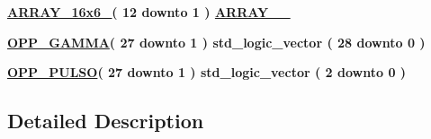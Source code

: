 \begin{DoxyCompactItemize}
\item 
{\bfseries \hyperlink{classmy__types__pkg_ae5bf53a48fc64a3742270ed7a11f5cee}{A\+R\+R\+A\+Y\+\_\+16x6\+\_}{\bfseries \textcolor{vhdlchar}{(}\textcolor{vhdlchar}{ }\textcolor{vhdlchar}{ } \textcolor{vhdldigit}{12} \textcolor{vhdlchar}{ }\textcolor{keywordflow}{downto}\textcolor{vhdlchar}{ }\textcolor{vhdlchar}{ } \textcolor{vhdldigit}{1} \textcolor{vhdlchar}{ }\textcolor{vhdlchar}{)}\textcolor{vhdlchar}{ }\textcolor{vhdlchar}{ }{\bfseries \hyperlink{classmy__types__pkg_af41402990f9932cce13ad0c292b52201}{A\+R\+R\+A\+Y\+\_\+\_}} \textcolor{vhdlchar}{ }}} 
\item 
{\bfseries \hyperlink{classmy__types__pkg_ada647f1e99db9f53367530a5f79c389f}{O\+P\+P\+\_\+\+G\+A\+M\+M\+A}{\bfseries \textcolor{vhdlchar}{(}\textcolor{vhdlchar}{ }\textcolor{vhdlchar}{ } \textcolor{vhdldigit}{27} \textcolor{vhdlchar}{ }\textcolor{keywordflow}{downto}\textcolor{vhdlchar}{ }\textcolor{vhdlchar}{ } \textcolor{vhdldigit}{1} \textcolor{vhdlchar}{ }\textcolor{vhdlchar}{)}\textcolor{vhdlchar}{ }\textcolor{vhdlchar}{ }\textcolor{comment}{std\+\_\+logic\+\_\+vector}\textcolor{vhdlchar}{ }\textcolor{vhdlchar}{(}\textcolor{vhdlchar}{ }\textcolor{vhdlchar}{ } \textcolor{vhdldigit}{28} \textcolor{vhdlchar}{ }\textcolor{keywordflow}{downto}\textcolor{vhdlchar}{ }\textcolor{vhdlchar}{ } \textcolor{vhdldigit}{0} \textcolor{vhdlchar}{ }\textcolor{vhdlchar}{)}\textcolor{vhdlchar}{ }}} 
\item 
{\bfseries \hyperlink{classmy__types__pkg_abd65dce9bfce515db5f02e1b036aaf05}{O\+P\+P\+\_\+\+P\+U\+L\+S\+O}{\bfseries \textcolor{vhdlchar}{(}\textcolor{vhdlchar}{ }\textcolor{vhdlchar}{ } \textcolor{vhdldigit}{27} \textcolor{vhdlchar}{ }\textcolor{keywordflow}{downto}\textcolor{vhdlchar}{ }\textcolor{vhdlchar}{ } \textcolor{vhdldigit}{1} \textcolor{vhdlchar}{ }\textcolor{vhdlchar}{)}\textcolor{vhdlchar}{ }\textcolor{vhdlchar}{ }\textcolor{comment}{std\+\_\+logic\+\_\+vector}\textcolor{vhdlchar}{ }\textcolor{vhdlchar}{(}\textcolor{vhdlchar}{ }\textcolor{vhdlchar}{ } \textcolor{vhdldigit}{2} \textcolor{vhdlchar}{ }\textcolor{keywordflow}{downto}\textcolor{vhdlchar}{ }\textcolor{vhdlchar}{ } \textcolor{vhdldigit}{0} \textcolor{vhdlchar}{ }\textcolor{vhdlchar}{)}\textcolor{vhdlchar}{ }}} 
\end{DoxyCompactItemize}


\subsection{Detailed Description}


